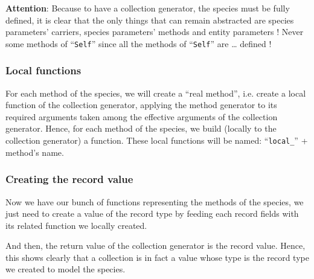 {\bf Attention}: Because to have a collection generator, the species
must be fully defined, it is clear that the only things that can
remain abstracted are species parameters' carriers, species
parameters' methods and entity parameters ! Never some methods of
``{\tt Self}'' since all the methods of ``{\tt Self}'' are \ldots
defined !


\subsubsection{Local functions}
For each method of the species, we will create a ``real method'',
i.e. create a local function of the collection generator, applying the
method generator to its required arguments taken among the effective
arguments of the collection generator. Hence, for each method of the
species, we build (locally to the collection generator) a function.
These local functions will be named: ``{\tt local\_}'' + method's
name.

\subsubsection{Creating the record value}
Now we have our bunch of functions representing the methods of the
species, we just need to create a value of the record type by feeding
each record fields with its related function we locally created.

And then, the return value of the collection generator is the record
value. Hence, this shows clearly that a collection is in fact a value
whose type is the record type we created to model the species.


